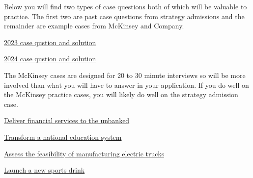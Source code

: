\documentclass[
  letterpaper,
  DIV=11,
  numbers=noendperiod]{scrreprt}
\begin{document}
Below you will find two types of case questions both of which will be
valuable to practice. The first two are past case questions from
strategy admissions and the remainder are example cases from McKinsey
and Company.

\href{https://byu-my.sharepoint.com/:w:/g/personal/murff_byu_edu/EYJXiOSdEslHqYeG5AQBLCQB21i0E1blVlS48a0T_oNxMQ?e=IrkYKv}{2023
case qustion and solution}

\href{https://byu-my.sharepoint.com/:w:/g/personal/murff_byu_edu/EY6gqE3YuhJBtc-IEHaNkbIBfsxePrwVqdYbLnxVnIS5dA?e=EeDaUA}{2024
case qustion and solution}

The McKinsey cases are designed for 20 to 30 minute interviews so will
be more involved than what you will have to answer in your application.
If you do well on the McKinsey practice cases, you will likely do well
on the strategy admission case.

\href{https://www.mckinsey.com/careers/interviewing/diconsa}{Deliver
financial services to the unbanked}

\href{https://www.mckinsey.com/careers/interviewing/national-education}{Transform
a national education system}

\href{https://www.mckinsey.com/careers/interviewing/talbot-trucks}{Assess
the feasibility of manufacturing electric trucks}

\href{https://www.mckinsey.com/careers/interviewing/electrolight}{Launch
a new sports drink}
\end{document}
